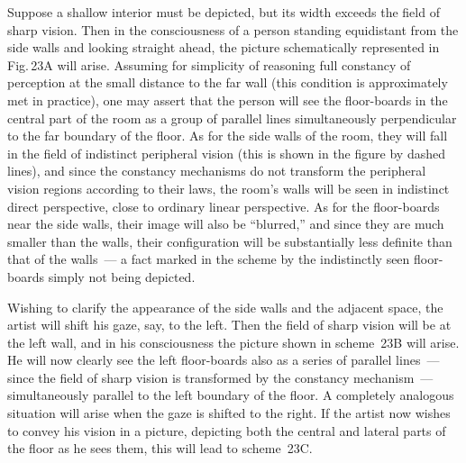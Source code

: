Suppose a shallow interior must be depicted, but its width exceeds the field of sharp
vision.  Then in the consciousness of a person standing equidistant from the side walls
and looking straight ahead, the picture schematically represented in Fig.\,23A will
arise.  Assuming for simplicity of reasoning full constancy of perception at the small
distance to the far wall (this condition is approximately met in practice), one may assert
that the person will see the floor-boards in the central part of the room as a group of
parallel lines simultaneously perpendicular to the far boundary of the floor.  As for the
side walls of the room, they will fall in the field of indistinct peripheral vision (this
is shown in the figure by dashed lines), and since the constancy mechanisms do not
transform the peripheral vision regions according to their laws, the room's walls will be
seen in indistinct direct perspective, close to ordinary linear perspective.  As for the
floor-boards near the side walls, their image will also be ``blurred,'' and since they are
much smaller than the walls, their configuration will be substantially less definite than
that of the walls~--- a fact marked in the scheme by the indistinctly seen floor-boards
simply not being depicted.


Wishing to clarify the appearance of the side walls and the adjacent space, the artist
will shift his gaze, say, to the left.  Then the field of sharp vision will be at the left
wall, and in his consciousness the picture shown in scheme~23B will arise.  He will now
clearly see the left floor-boards also as a series of parallel lines~--- since the field of
sharp vision is transformed by the constancy mechanism~--- simultaneously parallel to the
left boundary of the floor.  A completely analogous situation will arise when the gaze is
shifted to the right.  If the artist now wishes to convey his vision in a picture, depicting
both the central and lateral parts of the floor as he sees them, this will lead to scheme~23C.


